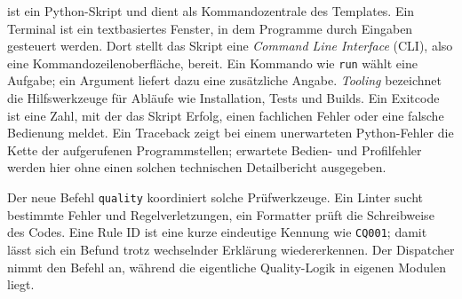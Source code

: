 \begin{beginnerstatement}

 ist ein Python-Skript und dient als Kommandozentrale
des Templates. Ein Terminal ist ein textbasiertes Fenster, in dem Programme
durch Eingaben gesteuert werden. Dort stellt das Skript eine
\emph{Command Line Interface} (CLI), also eine Kommandozeilenoberfläche,
bereit. Ein Kommando wie \texttt{run} wählt eine Aufgabe; ein Argument liefert
dazu eine zusätzliche Angabe. \emph{Tooling} bezeichnet die Hilfswerkzeuge für
Abläufe wie Installation, Tests und Builds. Ein Exitcode ist eine Zahl, mit
der das Skript Erfolg, einen fachlichen Fehler oder eine falsche Bedienung
meldet. Ein Traceback zeigt bei einem unerwarteten Python-Fehler die Kette der
aufgerufenen Programmstellen; erwartete Bedien- und Profilfehler werden hier
ohne einen solchen technischen Detailbericht ausgegeben.

Der neue Befehl \texttt{quality} koordiniert solche Prüfwerkzeuge. Ein Linter
sucht bestimmte Fehler und Regelverletzungen, ein Formatter prüft die
Schreibweise des Codes. Eine Rule ID ist eine kurze eindeutige Kennung wie
\texttt{CQ001}; damit lässt sich ein Befund trotz wechselnder Erklärung
wiedererkennen. Der Dispatcher nimmt den Befehl an, während die eigentliche
Quality-Logik in eigenen Modulen liegt.

\end{beginnerstatement}
